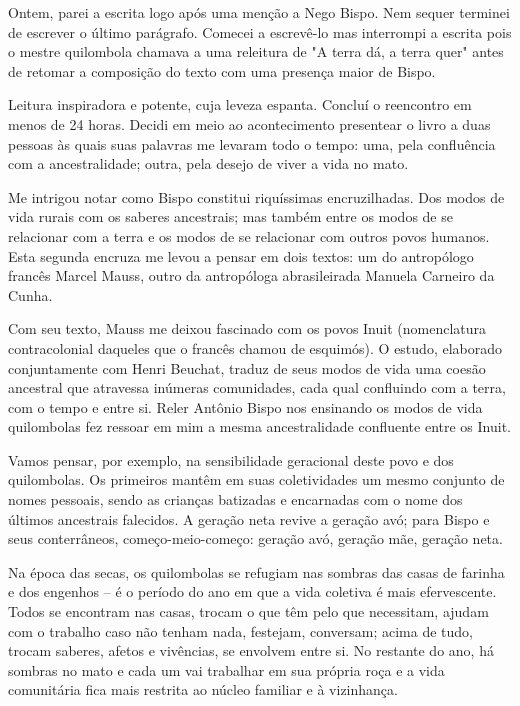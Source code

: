 
Ontem, parei a escrita logo após uma menção a Nego Bispo. Nem sequer terminei de escrever o último parágrafo. Comecei a escrevê-lo  mas  interrompi a escrita pois o mestre quilombola chamava a uma releitura de "A terra dá, a terra quer" antes de retomar a composição do texto com uma presença maior de Bispo.

Leitura inspiradora e potente, cuja leveza espanta. Concluí o reencontro em  menos de 24 horas. Decidi em meio ao acontecimento presentear o livro a duas pessoas às quais suas palavras me levaram todo o tempo: uma, pela confluência com a ancestralidade; outra, pela desejo de viver a vida no mato.

Me intrigou notar como Bispo constitui riquíssimas encruzilhadas. Dos modos de vida rurais com os saberes ancestrais; mas também entre os modos de se relacionar com a terra e os modos de se relacionar com outros povos humanos. Esta segunda encruza me levou a pensar em dois textos: um do antropólogo francês Marcel Mauss, outro da antropóloga abrasileirada Manuela Carneiro da Cunha.

Com seu texto, Mauss me deixou fascinado com os povos Inuit (nomenclatura contracolonial daqueles que o francês chamou de esquimós). O estudo, elaborado conjuntamente com Henri Beuchat, traduz de seus modos de vida uma coesão ancestral que atravessa inúmeras comunidades, cada qual confluindo com a terra, com o tempo e entre si. Reler Antônio Bispo nos ensinando os modos de vida quilombolas fez ressoar em mim a mesma ancestralidade confluente entre os Inuit.

Vamos pensar, por exemplo, na sensibilidade geracional deste povo e dos quilombolas. Os primeiros mantêm  em suas coletividades  um mesmo conjunto de nomes pessoais, sendo as  crianças batizadas e encarnadas com o nome dos últimos ancestrais  falecidos. A geração neta revive a geração avó; para Bispo e seus conterrâneos, começo-meio-começo: geração avó, geração mãe, geração neta.

Na época das secas, os quilombolas se refugiam nas sombras das casas de farinha e dos engenhos -- é o período do ano em que a vida coletiva é mais efervescente. Todos se encontram nas casas, trocam o que têm pelo que necessitam, ajudam com o trabalho caso não tenham nada, festejam, conversam; acima de tudo, trocam saberes, afetos e vivências, se envolvem entre si. No restante do ano, há sombras no mato e cada um vai trabalhar em sua própria roça e a vida comunitária fica mais restrita ao núcleo familiar e à vizinhança.

